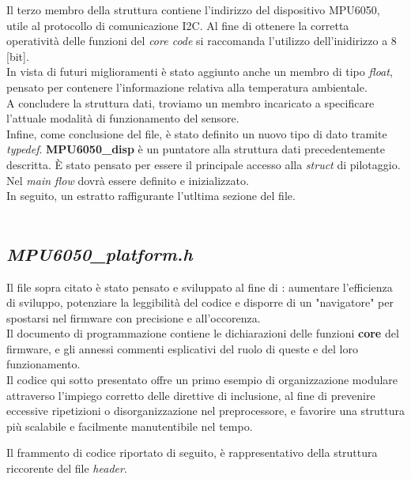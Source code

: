 \documentclass[11pt]{report}
\begin{document}
Il terzo membro della struttura contiene l'indirizzo del dispositivo MPU6050, utile al protocollo di comunicazione I2C. Al fine di ottenere la corretta operatività delle funzioni del \textit{core code} si raccomanda l'utilizzo dell'inidirizzo a 8 [bit].\\
In vista di futuri miglioramenti è stato aggiunto anche un membro di tipo \textit{float}, pensato per contenere l'informazione relativa alla temperatura ambientale.\\
A concludere la struttura dati, troviamo un membro incaricato a specificare l'attuale modalità di funzionamento del sensore.\\
Infine, come conclusione del file, è stato definito un nuovo tipo di dato tramite \textit{typedef}. \textbf{MPU6050\_disp} è un puntatore alla struttura dati precedentemente descritta. È stato pensato per essere il principale accesso alla \textit{struct} di pilotaggio. Nel \textit{main flow} dovrà essere definito e inizializzato.\\
In seguito, un estratto raffigurante l'utltima sezione del file.\\\\


\subsection{\textit{MPU6050\_platform.h}}
Il file sopra citato è stato pensato e sviluppato al fine di : aumentare l'efficienza di sviluppo, potenziare la leggibilità del codice e disporre di un "navigatore" per spostarsi nel firmware con precisione e all'occorenza.\\
Il documento di programmazione contiene le dichiarazioni delle funzioni \textbf{core} del firmware, e gli annessi commenti esplicativi del ruolo di queste e del loro funzionamento.\\
Il codice qui sotto presentato offre un primo esempio di organizzazione modulare attraverso l'impiego corretto delle direttive di inclusione, al fine di prevenire eccessive ripetizioni o disorganizzazione nel preprocessore, e favorire una struttura più scalabile e facilmente manutentibile nel tempo.

Il frammento di codice riportato di seguito, è rappresentativo della struttura riccorente del file \textit{header}.
\end{document}
